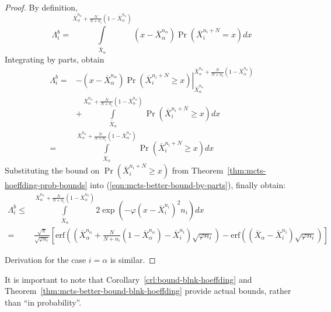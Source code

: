 \begin{proof}By definition,
\begin{equation}
\Lambda_i^b=\int\limits_{\overline X_\alpha}^{\overline X_\alpha^{n_\alpha}+\frac N {N+n_i}(1-\overline X_\alpha^{n_\alpha})}(x-\overline X_\alpha^{n_\alpha})\Pr\left(\overline X_i^{n_i+N}=x\right)dx
\label{eqn:mcts-lambda-blinkered-by-def}
\end{equation}
Integrating by parts, obtain
\begin{align}
\Lambda_i^b=&-\left.(x-\overline X_\alpha^{n_\alpha})\Pr\left(\overline X_i^{n_i+N}\ge x\right)\right|_{\overline X_\alpha^{n_\alpha}}^{\overline X_\alpha^{n_\alpha}+\frac N {N+n_i}(1-\overline X_\alpha^{n_\alpha})}\nonumber\\
&+\int\limits_{\overline X_\alpha}^{\overline X_\alpha^{n_\alpha}+\frac N {N+n_i}(1-\overline X_\alpha^{n_\alpha})}\Pr\left(\overline X_i^{n_i+N}\ge x\right)dx\nonumber\\
=&\int\limits_{\overline X_\alpha}^{\overline X_\alpha^{n_\alpha}+\frac N {N+n_i}(1-\overline X_\alpha^{n_\alpha})}\Pr\left(\overline X_i^{n_i+N}\ge x\right)dx
\label{eqn:mcts-better-bound-by-parts}
\end{align}
Substituting the bound on $\Pr\left(\overline X_i^{n_i+N}\ge x\right)$ from Theorem~\ref{thm:mcts-hoeffding-prob-bounds} into (\ref{eqn:mcts-better-bound-by-parts}), finally obtain:
\begin{align}
\Lambda_i^b\le&\int\limits_{\overline X_\alpha}^{\overline X_\alpha^{n_\alpha}+\frac N {N+n_i}(1-\overline X_\alpha^{n_\alpha})}2\exp\left(-\varphi(x-\overline X_i^{n_i})^2n_i\right)dx\nonumber\\
 =&\frac {\sqrt \pi} {\sqrt {\varphi n_i}}
  \left[\mathrm{erf}\left(\left(\overline X_\alpha^{n_\alpha}+\frac N {N+n_i}(1-\overline X_\alpha^{n_\alpha})-\overline X_i^{n_i}\right)\sqrt {\varphi n_i}\right)-\mathrm{erf}\left((\overline X_\alpha - \overline X_i^{n_i})\sqrt{\varphi n_i}\right)\right]
\end{align}

Derivation for the case $i=\alpha$ is similar.
\end{proof}
\vspace{\baselineskip}
It is important to note that Corollary~\ref{crl:bound-blnk-hoeffding}
and Theorem~\ref{thm:mcts-better-bound-blnk-hoeffding}
provide actual bounds, rather than ``in probability''.

